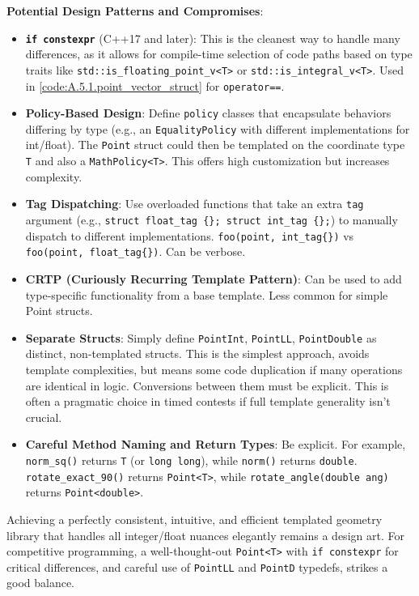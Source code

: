 \begin{openquestion}
\textbf{Potential Design Patterns and Compromises}:
\begin{itemize}
    \item \textbf{\texttt{if constexpr}} (C++17 and later): This is the cleanest way to handle many differences, as it allows for compile-time selection of code paths based on type traits like \texttt{std::is\_floating\_point\_v<T>} or \texttt{std::is\_integral\_v<T>}. Used in \cref{code:A.5.1.point_vector_struct} for \texttt{operator==}.
    \item \textbf{Policy-Based Design}: Define \texttt{policy} classes that encapsulate behaviors differing by type (e.g., an \texttt{EqualityPolicy} with different implementations for int/float). The \texttt{Point} struct could then be templated on the coordinate type \texttt{T} and also a \texttt{MathPolicy<T>}. This offers high customization but increases complexity.
    \item \textbf{Tag Dispatching}: Use overloaded functions that take an extra \texttt{tag} argument (e.g., \texttt{struct float\_tag \{\}; struct int\_tag \{\};}) to manually dispatch to different implementations. \texttt{foo(point, int\_tag\{\})} vs \texttt{foo(point, float\_tag\{\})}. Can be verbose.
    \item \textbf{CRTP (Curiously Recurring Template Pattern)}: Can be used to add type-specific functionality from a base template. Less common for simple Point structs.
    \item \textbf{Separate Structs}: Simply define \texttt{PointInt}, \texttt{PointLL}, \texttt{PointDouble} as distinct, non-templated structs. This is the simplest approach, avoids template complexities, but means some code duplication if many operations are identical in logic. Conversions between them must be explicit. This is often a pragmatic choice in timed contests if full template generality isn't crucial.
    \item \textbf{Careful Method Naming and Return Types}: Be explicit. For example, \texttt{norm\_sq()} returns \texttt{T} (or \texttt{long long}), while \texttt{norm()} returns \texttt{double}. \texttt{rotate\_exact\_90()} returns \texttt{Point<T>}, while \texttt{rotate\_angle(double ang)} returns \texttt{Point<double>}.
\end{itemize}
Achieving a perfectly consistent, intuitive, and efficient templated geometry library that handles all integer/float nuances elegantly remains a design art. For competitive programming, a well-thought-out \texttt{Point<T>} with \texttt{if constexpr} for critical differences, and careful use of \texttt{PointLL} and \texttt{PointD} typedefs, strikes a good balance.
\end{openquestion}